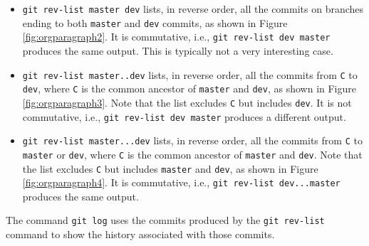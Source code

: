 \documentclass[11pt]{article}
\begin{document}
\begin{itemize}
\item \texttt{git rev-list master dev} lists, in reverse order, all the commits on branches ending to both \texttt{master} and \texttt{dev} commits, as shown in Figure \ref{fig:orgparagraph2}. It is commutative, i.e., \texttt{git rev-list dev master} produces the same output. This is typically not a very interesting case.
\item \texttt{git rev-list master..dev} lists, in reverse order, all the commits from \texttt{C} to \texttt{dev}, where \texttt{C} is the common ancestor of \texttt{master} and \texttt{dev}, as shown in Figure \ref{fig:orgparagraph3}. Note that the list excludes \texttt{C} but includes \texttt{dev}. It is not commutative, i.e., \texttt{git rev-list dev master} produces a different output.
\item \texttt{git rev-list master...dev} lists, in reverse order, all the commits from \texttt{C} to \texttt{master} or \texttt{dev}, where \texttt{C} is the common ancestor of \texttt{master} and \texttt{dev}. Note that the list excludes \texttt{C} but includes \texttt{master} and \texttt{dev}, as shown in Figure \ref{fig:orgparagraph4}. It is commutative, i.e., \texttt{git rev-list dev...master} produces the same output.
\end{itemize}

The command \texttt{git log} uses the commits produced by the \texttt{git rev-list} command to show the history associated with those commits.
\end{document}
